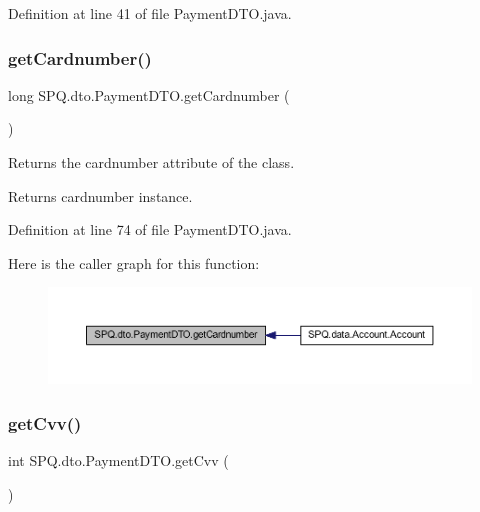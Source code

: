 Definition at line 41 of file Payment\+D\+T\+O.\+java.

\mbox{\label{class_s_p_q_1_1dto_1_1_payment_d_t_o_ac2a8a2ab315f3027f25780a84da0b824}} 
\subsubsection{\texorpdfstring{get\+Cardnumber()}{getCardnumber()}\hspace{0.1cm}{\footnotesize\ttfamily [3/3]}}
{\footnotesize\ttfamily long S\+P\+Q.\+dto.\+Payment\+D\+T\+O.\+get\+Cardnumber (\begin{DoxyParamCaption}{ }\end{DoxyParamCaption})}

Returns the cardnumber attribute of the class. \begin{DoxyReturn}{Returns}
cardnumber instance. 
\end{DoxyReturn}


Definition at line 74 of file Payment\+D\+T\+O.\+java.

Here is the caller graph for this function\+:\nopagebreak
\begin{figure}[H]
\begin{center}
\leavevmode
\includegraphics[width=350pt]{class_s_p_q_1_1dto_1_1_payment_d_t_o_ac2a8a2ab315f3027f25780a84da0b824_icgraph}
\end{center}
\end{figure}
\mbox{\label{class_s_p_q_1_1dto_1_1_payment_d_t_o_a64fb9df59333fcc2a0c8bea48024354d}} 
\subsubsection{\texorpdfstring{get\+Cvv()}{getCvv()}\hspace{0.1cm}{\footnotesize\ttfamily [1/3]}}
{\footnotesize\ttfamily int S\+P\+Q.\+dto.\+Payment\+D\+T\+O.\+get\+Cvv (\begin{DoxyParamCaption}{ }\end{DoxyParamCaption})}



